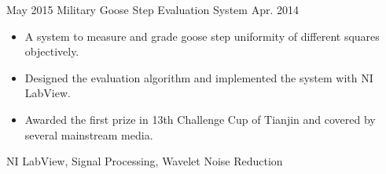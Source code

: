 \begin{projects}
	\emptySeparator
	
	\project
	{May 2015}		{Military Goose Step Evaluation System}
	{Apr. 2014}		{\begin{itemize}
			\item A system to measure and grade goose step uniformity of different squares objectively. 
			\item Designed the evaluation algorithm and implemented the system with NI LabView.
			\item Awarded the first prize in 13th Challenge Cup of Tianjin and covered by several mainstream media.
		\end{itemize} 
	}
	{NI LabView, Signal Processing, Wavelet Noise Reduction}

\end{projects}

